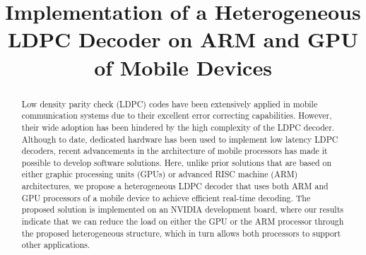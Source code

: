 \documentclass[conference]{IEEEtran}
\begin{document}
\title{Implementation of a Heterogeneous LDPC Decoder on ARM and GPU of Mobile Devices}

\author{}


\maketitle

\begin{abstract}

Low density parity check (LDPC) codes have been extensively applied in mobile communication systems due to their excellent error correcting capabilities. However, their wide adoption has been hindered by the high complexity of the LDPC decoder. Although to date, dedicated hardware has been used to implement low latency LDPC decoders, recent advancements in the architecture of mobile processors has made it possible to develop software solutions. Here, unlike prior solutions that are based on either graphic processing units (GPUs) or advanced RISC machine (ARM) architectures, we propose a heterogeneous LDPC decoder that uses both ARM and GPU processors of a mobile device to achieve efficient real-time decoding. The proposed solution is implemented on an NVIDIA development board, where our results indicate that we can reduce the load on either the GPU or the ARM processor through the proposed heterogeneous structure, which in turn allows both processors to support other applications.

\end{abstract}

\end{document}
